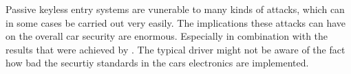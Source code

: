 Passive keyless entry systems are vunerable to many kinds of attacks,
which can in some cases be carried out very easily.
The implications these attacks can have on the overall car security are enormous.
Especially in combination with the results that were achieved by \cite{expModernAuto}.
The typical driver might not be aware of the fact how bad the securtiy standards
in the cars electronics are implemented.